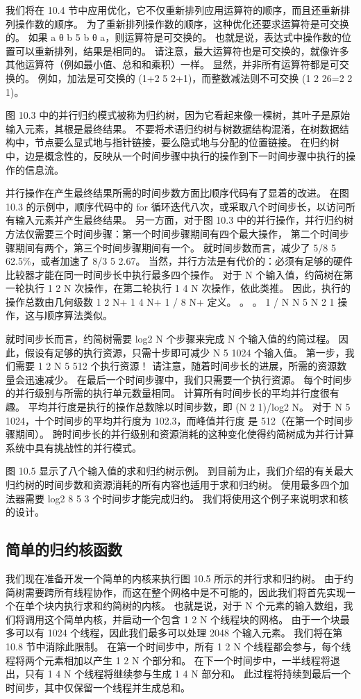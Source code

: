 我们将在 10.4 节中应用优化，它不仅重新排列应用运算符的顺序，而且还重新排列操作数的顺序。 
为了重新排列操作数的顺序，这种优化还要求运算符是可交换的。 如果 a θ b 5 b θ a，则运算符是可交换的。 
也就是说，表达式中操作数的位置可以重新排列，结果是相同的。 
请注意，最大运算符也是可交换的，就像许多其他运算符（例如最小值、总和和乘积）一样。 
显然，并非所有运算符都是可交换的。 例如，加法是可交换的 (1+2 5 2+1)，而整数减法则不可交换 (1 2 26=2 2 1)。

图 10.3 中的并行归约模式被称为归约树，因为它看起来像一棵树，其叶子是原始输入元素，其根是最终结果。 
不要将术语归约树与树数据结构混淆，在树数据结构中，节点要么显式地与指针链接，要么隐式地与分配的位置链接。 
在归约树中，边是概念性的，反映从一个时间步骤中执行的操作到下一时间步骤中执行的操作的信息流。

并行操作在产生最终结果所需的时间步数方面比顺序代码有了显着的改进。 
在图 10.3 的示例中，顺序代码中的 for 循环迭代八次，或采取八个时间步长，以访问所有输入元素并产生最终结果。 
另一方面，对于图 10.3 中的并行操作，并行归约树方法仅需要三个时间步骤：第一个时间步骤期间有四个最大操作，
第二个时间步骤期间有两个，第三个时间步骤期间有一个。 就时间步数而言，减少了 5/8 5 62.5\%，或者加速了 8/3 5 2.67。 
当然，并行方法是有代价的：必须有足够的硬件比较器才能在同一时间步长中执行最多四个操作。 
对于 N 个输入值，约简树在第一轮执行 1 2 N 次操作，在第二轮执行 1 4 N 次操作，依此类推。 
因此，执行的操作总数由几何级数 1 2 N+ 1 4 N+ 1 / 8 N+ 定义。 。 。 1 / N N 5 N 2 1 操作，这与顺序算法类似。

就时间步长而言，约简树需要 log2 N 个步骤来完成 N 个输入值的约简过程。 
因此，假设有足够的执行资源，只需十步即可减少 N 5 1024 个输入值。 
第一步，我们需要 1 2 N 5 512 个执行资源！ 请注意，随着时间步长的进展，所需的资源数量会迅速减少。 
在最后一个时间步骤中，我们只需要一个执行资源。 每个时间步的并行级别与所需的执行单元数量相同。 
计算所有时间步长的平均并行度很有趣。 平均并行度是执行的操作总数除以时间步数，即 (N 2 1)/log2 N。
对于 N 5 1024，十个时间步的平均并行度为 102.3，而峰值并行度 是 512（在第一个时间步骤期间）。 
跨时间步长的并行级别和资源消耗的这种变化使得约简树成为并行计算系统中具有挑战性的并行模式。

图 10.5 显示了八个输入值的求和归约树示例。 
到目前为止，我们介绍的有关最大归约树的时间步数和资源消耗的所有内容也适用于求和归约树。 
使用最多四个加法器需要 log2 8 5 3 个时间步才能完成归约。 我们将使用这个例子来说明求和核的设计。

\subsection{简单的归约核函数}
我们现在准备开发一个简单的内核来执行图 10.5 所示的并行求和归约树。 
由于约简树需要跨所有线程协作，而这在整个网格中是不可能的，因此我们将首先实现一个在单个块内执行求和约简树的内核。 
也就是说，对于 N 个元素的输入数组，我们将调用这个简单内核，并启动一个包含 1 2 N 个线程块的网格。 
由于一个块最多可以有 1024 个线程，因此我们最多可以处理 2048 个输入元素。 我们将在第 10.8 节中消除此限制。 
在第一个时间步中，所有 1 2 N 个线程都会参与，每个线程将两个元素相加以产生 1 2 N 个部分和。 
在下一个时间步中，一半线程将退出，只有 1 4 N 个线程将继续参与生成 1 4 N 部分和。 
此过程将持续到最后一个时间步，其中仅保留一个线程并生成总和。

